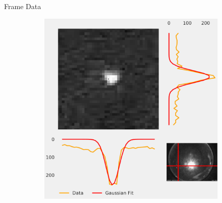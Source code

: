 \documentclass[final]{beamer}
\newlength{\twocolwid}
\begin{document}
\begin{frame}[t]
\begin{columns}[t]
\begin{column}{\twocolwid}
\begin{alertblock}{Frame Data}
\begin{figure}
\begin{subfigure}{.5\textwidth}
  \includegraphics[width=\linewidth]{testplot2.pdf}
  \label{fig:sub2}
\end{subfigure}
\label{fig:test}
\end{figure}
\vspace{-1cm}
\end{alertblock}








\end{column}
\end{columns}
\end{frame}
\end{document}
